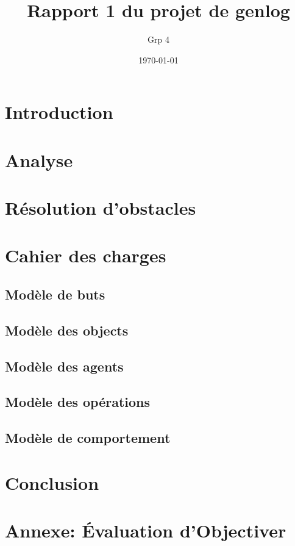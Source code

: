 \documentclass[12pt,openany]{book}
\title{Rapport 1 du projet de genlog}
\author{Grp 4}
\date{\today}
\begin{document}
\setlength{\parskip}{1em}

\maketitle
\tableofcontents

\chapter*{Introduction}
	
\chapter{Analyse}
	

\chapter{Résolution d'obstacles}
	

\chapter{Cahier des charges}
	\section{Modèle de buts}
		

	\section{Modèle des objects}
		

	\section{Modèle des agents}
		

	\section{Modèle des opérations}
		

	\section{Modèle de comportement}
		

\chapter*{Conclusion}
	

\chapter{Annexe: Évaluation d'Objectiver}
	
\end{document}
